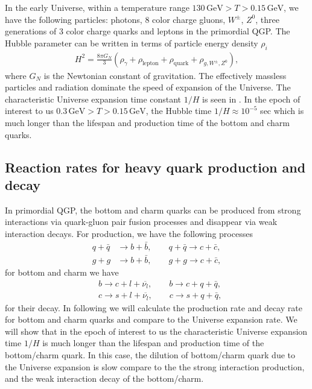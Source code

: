 In the early Universe, within a temperature range $130\, \mathrm{GeV}>T>0.15\,\mathrm{GeV}$,  we have the following particles:  photons, $8$ color charge gluons, $W^\pm$, $Z^0$, three generations of $3$ color charge quarks and leptons in the primordial QGP.  The Hubble parameter can be written in terms of particle energy density $\rho_i$
\begin{align}
H^2=\frac{8\pi G_N}{3}\left(\rho_\gamma+\rho_{\mathrm{lepton}}+\rho_{\mathrm{quark}}+\rho_{g,{W^\pm},{Z^0}}\right),
\end{align}
where $G_N$ is the Newtonian constant of gravitation. The effectively massless particles and radiation dominate the speed of expansion of the Universe. The characteristic Universe expansion time constant $1/H$ is seen in . In the epoch of interest to us $0.3\,\mathrm{GeV}>T>0.15\,\mathrm{GeV}$, the Hubble time $1/H\approx10^{-5}$ sec which is much longer than the lifespan and production time of the bottom and charm quarks. 

\subsection{Reaction rates for heavy quark  production and decay}
In primordial QGP, the bottom and charm quarks can be produced from strong interactions via quark-gluon pair fusion processes and disappear via weak interaction decays. For production, we have the following processes
\begin{align}
 q+\bar{q}&\longrightarrow b+\bar b,\qquad q+\bar{q}\longrightarrow c+\bar c,\\
 g+g&\longrightarrow b+\bar b,\qquad g+g\longrightarrow c+\bar c,
\end{align}
for bottom and charm we have
\begin{align}
 &b\longrightarrow c+l+\overline{\nu_l}, \qquad b\longrightarrow c+q+\bar{q},\\
&c\longrightarrow s+l+\overline{\nu_l},\qquad c\longrightarrow s+q+\bar{q},
\end{align}
for their decay. In following we will calculate the production rate and decay rate for bottom and charm quarks and compare to the Universe expansion rate. We will show that in the epoch of interest to us the characteristic Universe expansion time $1/H$ is much longer than the lifespan and production time of the bottom/charm quark. In this case, the dilution of bottom/charm quark due to the Universe expansion is slow compare to the the strong interaction production, and the weak interaction decay of the bottom/charm. 
 


